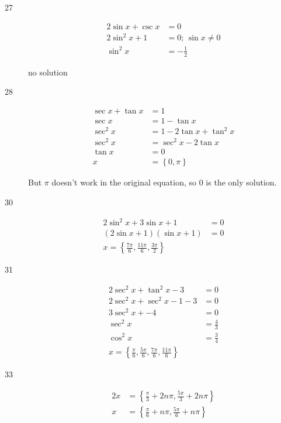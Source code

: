 \documentclass[fleqn,addpoints]{exam}
\begin{document}
\begin{description}
\item[27] 
\begin{align*}
  2 \sin x + \csc x & = 0 \\ 
  2 \sin^2 x + 1 &= 0 \text{; } \sin x \neq 0\\ 
  \sin^2 x &= - \frac{1}{2}
\end{align*}

no solution

\item[28] 
\begin{align*}
  \sec x + \tan x &= 1 \\
  \sec x &= 1 - \tan x \\
  \sec^2 x &= 1 - 2\tan x + \tan^2 x \\
  \sec^2 x &= \sec^2 x - 2\tan x \\
  \tan x &= 0 \\
  x &= \left\{ 0, \pi \right\}
\end{align*}

But $\pi$ doesn't work in the original equation, so 0 is the only solution.

\item[30] 
\begin{align*}
  2 \sin^2 x + 3 \sin x + 1 &= 0 \\
  (2 \sin x + 1)(\sin x + 1) &= 0 \\
  x = \left\{ \frac{7 \pi}{6}, \frac{11 \pi}{6}, \frac{3 \pi}{2} \right\}
\end{align*}

\item[31] 
\begin{align*}
  2 \sec^2 x + \tan^2 x -3  &= 0 \\
  2 \sec^2 x + \sec^2 x - 1 -3  &= 0 \\
  3 \sec^2 x + - 4  &= 0 \\
  \sec^2 x  &= \frac{4}{3} \\
  \cos^2 x  &= \frac{3}{4} \\
  x = \left\{ \frac{\pi}{6}, \frac{5 \pi}{6}, \frac{7 \pi}{6}, \frac{11 \pi}{6} \right\}
\end{align*}

\item[33]
\begin{align*}
  2x &= \left\{\frac{\pi}{3} + 2n\pi, \frac{5 \pi}{3} + 2n\pi\right\} \\
  x &= \left\{\frac{\pi}{6} + n\pi, \frac{5 \pi}{6} + n\pi\right\} \\
\end{align*} 


\end{description}
\end{document}
